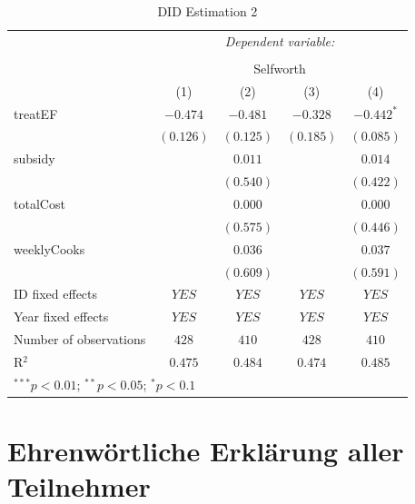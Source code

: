 \documentclass[12pt, a4paper, titlepage]{article}\usepackage[]{graphicx}\usepackage[]{color}
\begin{document}
\begin{table}
\begin{center}
\begin{tabular}{l c c c c}
& \multicolumn{4}{c}{\textit{Dependent variable:}} \\
\cline{2-5}
\\[-1.8ex] & \multicolumn{4}{c}{Selfworth} \\
\hline
 & (1) & (2) & (3) & (4) \\
\hline
treatEF                & $-0.474$  & $-0.481$  & $-0.328$  & $-0.442^{*}$ \\
                       & $(0.126)$ & $(0.125)$ & $(0.185)$ & $(0.085)$    \\
subsidy                &           & $0.011$   &           & $0.014$      \\
                       &           & $(0.540)$ &           & $(0.422)$    \\
totalCost              &           & $0.000$   &           & $0.000$      \\
                       &           & $(0.575)$ &           & $(0.446)$    \\
weeklyCooks            &           & $0.036$   &           & $0.037$      \\
                       &           & $(0.609)$ &           & $(0.591)$    \\
\hline
ID fixed effects       & $YES$     & $YES$     & $YES$     & $YES$        \\
Year fixed effects     & $YES$     & $YES$     & $YES$     & $YES$        \\
Number of observations & $428$     & $410$     & $428$     & $410$        \\
R$^2$                  & $0.475$   & $0.484$   & $0.474$   & $0.485$      \\
\hline
\multicolumn{5}{l}{\scriptsize{$^{***}p<0.01$; $^{**}p<0.05$; $^{*}p<0.1$}}
\end{tabular}
\caption{DID Estimation 2}
\label{table:coefficients4}
\end{center}
\end{table}


\section{Ehrenwörtliche Erklärung aller Teilnehmer}
\end{document}
